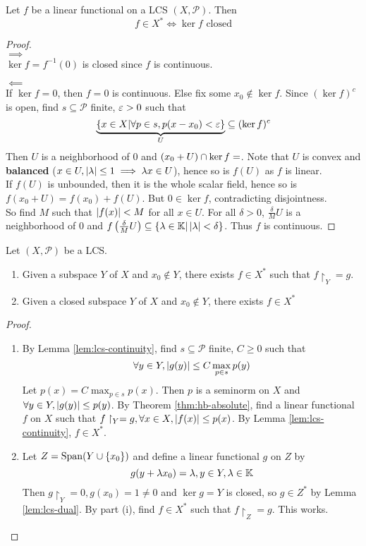 \documentclass{article}
\begin{document}
\begin{nlemma}\label{lem:lcs-dual}
  Let $f$ be a linear functional on a LCS $(X, \mathcal P)$. Then
  $$f \in X^* \iff \ker f \text{ closed}$$
\end{nlemma}
\begin{proof}~\\
  $\implies$ \\
  $\ker f = f^{-1}(0)$ is closed since $f$ is continuous.
  
  $\impliedby$ \\
  If $\ker f = 0$, then $f = 0$ is continuous. Else fix some $x_0 \nin \ker f$. Since $(\ker f)^c$ is open, find $s \subseteq \mathcal P$ finite, $\varepsilon > 0$ such that
  $$\underbrace{\{x \in X | \forall p \in s, p(x - x_0) < \varepsilon\}}_U \subseteq (\ker f)^c$$
  Then $U$ is a neighborhood of $0$ and $(x_0 + U) \cap \ker f = \empty$. Note that $U$ is convex and {\bf balanced} ($x \in U, \left\lvert \lambda\right\rvert \le 1 \implies \lambda x \in U$), hence so is $f(U)$ as $f$ is linear. \\
  If $f(U)$ is unbounded, then it is the whole scalar field, hence so is $f(x_0 + U) = f(x_0) + f(U)$. But $0 \in \ker f$, contradicting disjointness. \\
  So find $M$ such that $\left\lvert f(x)\right\rvert < M$ for all $x \in U$. For all $\delta > 0$, $\frac\delta M U$ is a neighborhood of $0$ and $f\left(\frac\delta M U\right) \subseteq \{\lambda \in \mathbb K | \left\lvert \lambda\right\rvert < \delta\}$. Thus $f$ is continuous.
\end{proof}

\begin{nthm}
  Let $(X, \mathcal P)$ be a LCS.
  \begin{enumerate}
    \item Given a subspace $Y$ of $X$ and $x_0 \nin Y$, there exists $f \in X^*$ such that $f\restriction_Y = g$.
    \item Given a closed subspace $Y$ of $X$ and $x_0 \nin Y$, there exists $f \in X^*$
  \end{enumerate}
\end{nthm}
\begin{proof}~

  \begin{enumerate}
    \item By Lemma \ref{lem:lcs-continuity}, find $s \subseteq \mathcal P$ finite, $C \ge 0$ such that
    $$\forall y \in Y, \left\lvert g(y)\right\rvert \le C\max_{p \in s}p(y)$$
    Let $p(x) = C\max_{p \in s}p(x)$. Then $p$ is a seminorm on $X$ and $\forall y \in Y, \left\lvert g(y)\right\rvert \le p(y)$. By Theorem \ref{thm:hb-absolute}, find a linear functional $f$ on $X$ such that $f\restriction_Y = g, \forall x \in X, \left\lvert f(x)\right\rvert \le p(x)$. By Lemma \ref{lem:lcs-continuity}, $f \in X^*$.
    \item Let $Z = \mathrm{Span}(Y \cup \{x_0\})$ and define a linear functional $g$ on $Z$ by
    $$g(y + \lambda x_0) = \lambda, y \in Y, \lambda \in \mathbb K$$
    Then $g\restriction_Y = 0, g(x_0) = 1 \ne 0$ and $\ker g = Y$ is closed, so $g \in Z^*$ by Lemma \ref{lem:lcs-dual}. By part (i), find $f \in X^*$ such that $f\restriction_Z = g$. This works.
  \end{enumerate}
\end{proof}
\end{document}
